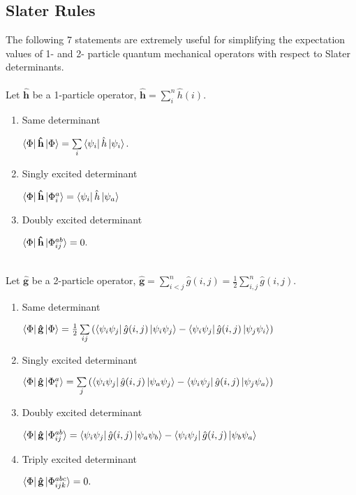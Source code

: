 \documentclass{article}
\newcommand{\vsp}{\vspace{0.2cm}}
\newcommand{\suml}{\ensuremath{\sum\limits}}
\newcommand{\boldh}{\ensuremath{\mathbf{\hat{h}}}}
\newcommand{\boldg}{\ensuremath{\mathbf{\hat{g}}}}
\begin{document}
\subsection{Slater Rules}
The following 7 statements are extremely useful for simplifying the expectation values of 1- and 2- particle quantum mechanical operators with respect to Slater determinants. \vsp \\
 \vspace{0.2cm} \\
Let $\boldh$ be a 1-particle operator, $\boldh = \suml_i^n \hat{h}(i) $.
\begin{enumerate}
\item Same determinant
\begin{center}
$\bra{\Phi}\boldh \ket{\Phi} = \suml_i \bra{\psi_i} \hat{h}\ket{\psi_i}$. 
\end{center}
\item Singly excited determinant
\begin{center}
$\bra{\Phi}\boldh\ket{\Phi_i^a} = \bra{\psi_i} \hat{h} \ket{\psi_a}$
\end{center}
\item Doubly excited determinant
\begin{center}
$ \bra{\Phi} \boldh \ket{\Phi_{ij}^{ab}} = 0. $
\end{center}
\end{enumerate}

 \vsp \\
Let $\boldg$ be a 2-particle operator, $\boldg = \suml_{i<j}^n \hat{g}(i,j) = \frac{1}{2}\suml_{i,j}^n \hat{g}(i,j) $.
\begin{enumerate}
\item Same determinant
\begin{center}
$ \bra{\Phi}\boldg\ket{\Phi} = \frac{1}{2} \suml_{ij} \left( \bra{\psi_i \psi_j}\hat{g}(i,j) \ket{\psi_i \psi_j} -  \bra{\psi_i \psi_j}\hat{g}(i,j) \ket{\psi_j \psi_i} \right) $ 
\end{center}
\item Singly excited determinant
\begin{center}
$\bra{\Phi}\boldg\ket{\Phi_i^a} = \suml_{j} \left( \bra{\psi_i \psi_j} \hat{g}(i,j)\ket{\psi_a \psi_j} - \bra{\psi_i \psi_j} \hat{g}(i,j)\ket{\psi_j \psi_a} \right)$
\end{center}
\item Doubly excited determinant
\begin{center}
$\bra{\Phi}\boldg\ket{\Phi_{ij}^{ab}} = \bra{\psi_i \psi_j}\hat{g}(i,j) \ket{\psi_a \psi_b} -\bra{\psi_i \psi_j}\hat{g}(i,j) \ket{\psi_b \psi_a} $
\end{center}
\item Triply excited determinant
\begin{center}
$\bra{\Phi}\boldg\ket{\Phi_{ijk}^{abc}} = 0. $
\end{center}
\end{enumerate}
\end{document}
